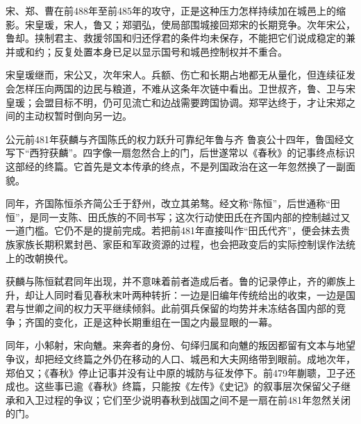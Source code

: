 宋、郑、曹在前488年至前485年的攻守，正是这种压力怎样持续加在城邑上的缩影。宋皇瑗，宋人，鲁又；郑驷弘，使局部围城接回郑宋的长期竞争。次年宋公，鲁却。挟制君主、救援邻国和归还俘君的条件均未保存，不能把它们说成稳定的兼并或和约；反复处置本身已足以显示国号和城邑控制权并不重合。

宋皇瑗继而，宋公又，次年宋人。兵额、伤亡和长期占地都无从量化，但连续征发会怎样压向两国的边民与粮道，不难从这条年次链中看出。卫世叔齐，鲁、卫与宋皇瑗；会盟目标不明，仍可见流亡和边战需要跨国协调。郑罕达终于，才让宋郑之间的主动权暂时倒向另一边。

\begin{event}{公元前481年}{获麟与齐国陈氏的权力跃升}{可靠纪年}{鲁与齐}
鲁哀公十四年，鲁国经文写下“西狩获麟”。四字像一扇忽然合上的门，后世遂常以《春秋》的记事终点标识这部经的终篇。它首先是文本传承的终点，不是列国政治在这一年忽然换了一副面貌。

同年，齐国陈恒杀齐简公壬于舒州，改立其弟骜。经文称“陈恒”，后世通称“田恒”，是同一支陈、田氏族的不同书写；这次行动使田氏在齐国内部的控制越过又一道门槛。它仍不是的提前完成。若把前481年直接叫作“田氏代齐”，便会抹去贵族家族长期积累封邑、家臣和军政资源的过程，也会把政变后的实际控制误作法统上的改朝换代。

获麟与陈恒弑君同年出现，并不意味着前者造成后者。鲁的记录停止，齐的卿族上升，却让人同时看见春秋末叶两种转折：一边是旧编年传统给出的收束，一边是国君与世卿之间的权力天平继续倾斜。此前弭兵保留的均势并未冻结各国内部的竞争；齐国的变化，正是这种长期重组在一国之内最显眼的一幕。
\end{event}

同年，小邾射，宋向魋。来奔者的身份、句绎归属和向魋的叛因都留有文本与地望争议，却把经文终篇之外仍在移动的人口、城邑和大夫网络带到眼前。成地次年，郑伯又；《春秋》停止记事并没有让中原的城防与征发停下。前479年蒯聩，卫子还成也。这些事已逾《春秋》终篇，只能按《左传》《史记》的叙事层次保留父子继承和入卫过程的争议；它们至少说明春秋到战国之间不是一扇在前481年忽然关闭的门。

